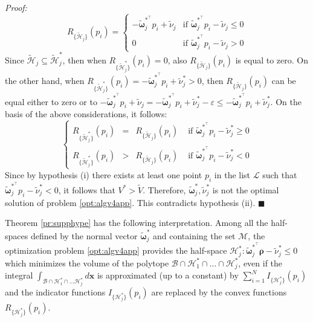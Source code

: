 \documentclass[twocolumn]{autart}
\newenvironment*{proof}{\emph{Proof:}}{}
\newcommand{\xhyp}{\mathbf{\rho}}
\begin{document}
\begin{proof}
\begin{equation}
R_{\{\mathcal{\tilde{H}}_j\}}(p_i)=\left\{\!\begin{array}{ll}
-\tilde{\boldsymbol{\omega}}_j^{*^\top} p_i+\tilde{\nu}_j & \mbox{if } \tilde{\boldsymbol{\omega}}_j^{*^\top} p_i-\tilde{\nu}_j \leq 0\\
                                    0 & \mbox{if } \tilde{\boldsymbol{\omega}}_j^{*^\top} p_i-\tilde{\nu}_j > 0
                                    \end{array}
\right.
\end{equation}
Since $\mathcal{\tilde{H}}_j \subseteq \mathcal{\tilde{H}}_j^*$, then when $R_{\{\tilde{\mathcal{H}}_j^*\}}(p_i) = 0$, also $R_{\{\mathcal{\tilde{H}}_j\}}(p_i)$ is equal to zero. On the other hand, when $R_{\{\tilde{\mathcal{H}}_j^*\}}(p_i)=-\tilde{\boldsymbol{\omega}}_j^{*^\top} p_i+\tilde{\nu}^*_j>0$, then $R_{\{\mathcal{\tilde{H}}_j\}}(p_i)$ can be equal either to zero or to $-\tilde{\boldsymbol{\omega}}_j^{*^\top} p_i+\tilde{\nu}_j=-\tilde{\boldsymbol{\omega}}_j^{*^\top} p_i+\tilde{\nu}^*_j-\varepsilon \leq -\tilde{\boldsymbol{\omega}}_j^{*^\top} p_i+\tilde{\nu}^*_j$. On the basis of the above considerations, it follows:
 \begin{equation}
 \left\{
 \begin{array}{lllllll}
   R_{\{\tilde{\mathcal{H}}_j^*\}}(p_i) &=&  R_{\{\mathcal{\tilde{H}}_j\}}(p_i) & \mbox{ if } \tilde{\boldsymbol{\omega}}_j^{*^\top} p_i-\tilde{\nu}^*_j \geq 0\\
   R_{\{\tilde{\mathcal{H}}_j^*\}}(p_i) &>&  R_{\{\mathcal{\tilde{H}}_j\}}(p_i) & \mbox{ if } \tilde{\boldsymbol{\omega}}_j^{*^\top} p_i-\tilde{\nu}^*_j < 0
 \end{array}
 \right.
 \end{equation}
 Since by hypothesis (i) there exists at least one point $p_i$ in the list $\mathcal{L}$ such that $\tilde{\boldsymbol{\omega}}_j^{*^\top} p_i-\tilde{\nu}^*_j < 0$, it follows that $V^* > \tilde{V}$. Therefore, $\tilde{\boldsymbol{\omega}}_j^{*},\tilde{\nu}^*_j$ is not the optimal solution of problem \eqref{opt:algv4app}. This contradicts hypothesis (ii). \hfill $\blacksquare$
\end{proof}

   Theorem \ref{pr:supphype} has the following interpretation. Among all the half-spaces defined by the normal vector $\tilde{\boldsymbol{\omega}}_j^{*}$ and containing  the set $\mathcal{M}$,  the optimization problem \eqref{opt:algv4app} provides the half-space  $\mathcal{H}_j^*: \tilde{\boldsymbol{\omega}}_j^{*^\top} \xhyp-\tilde{\nu}^*_j\leq 0$ which minimizes the volume of the polytope $\mathcal{B} \cap \mathcal{H}_1^* \cap \ldots \cap \mathcal{H}^*_{j}$, even if the integral  $\int_{\mathcal{B} \cap \mathcal{H}^*_1 \cap \ldots \mathcal{H}^*_{j}}d\mathbf{x}$ is approximated (up to a constant)  by $ \sum_{i=1}^N I_{\{\mathcal{H}^*_j\}}(p_i)$ and the indicator functions $I_{\{\mathcal{H}^*_j\}}(p_i)$ are replaced by the convex functions $R_{\{\mathcal{H}^*_j\}}(p_i)$.\\
\end{document}
